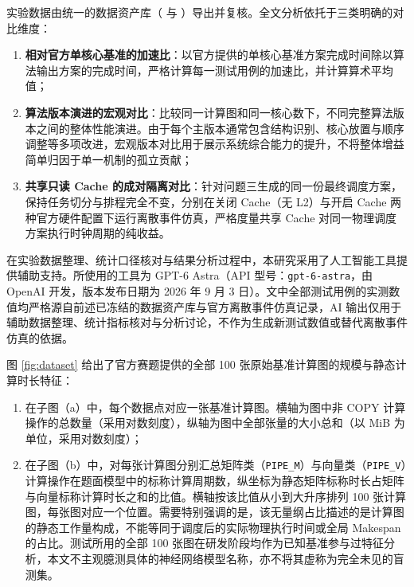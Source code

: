 \documentclass[anonymous,withtoc]{gmcm2026}
\providecommand{\tightlist}{\setlength{\itemsep}{0pt}\setlength{\parskip}{0pt}}
\begin{document}
实验数据由统一的数据资产库（\texttt{} 与 \texttt{}）导出并复核。全文分析依托于三类明确的对比维度：

\begin{enumerate}
\def\labelenumi{\arabic{enumi}.}
\tightlist
\item
  \textbf{相对官方单核心基准的加速比}：以官方提供的单核心基准方案完成时间除以算法输出方案的完成时间，严格计算每一测试用例的加速比，并计算算术平均值；
\item
  \textbf{算法版本演进的宏观对比}：比较同一计算图和同一核心数下，不同完整算法版本之间的整体性能演进。由于每个主版本通常包含结构识别、核心放置与顺序调整等多项改进，宏观版本对比用于展示系统综合能力的提升，不将整体增益简单归因于单一机制的孤立贡献；
\item
  \textbf{共享只读 Cache 的成对隔离对比}：针对问题三生成的同一份最终调度方案，保持任务切分与排程完全不变，分别在关闭 Cache（无 L2）与开启 Cache 两种官方硬件配置下运行离散事件仿真，严格度量共享 Cache 对同一物理调度方案执行时钟周期的纯收益。
\end{enumerate}

在实验数据整理、统计口径核对与结果分析过程中，本研究采用了人工智能工具提供辅助支持。所使用的工具为 GPT-6 Astra（API 型号：\texttt{gpt-6-astra}，由 OpenAI 开发，版本发布日期为 2026 年 9 月 3 日）\cite{openai-gpt6-astra}。文中全部测试用例的实测数值均严格源自前述已冻结的数据资产库与官方离散事件仿真记录，AI 输出仅用于辅助数据整理、统计指标核对与分析讨论，不作为生成新测试数值或替代离散事件仿真的依据。

图 \ref{fig:dataset} 给出了官方赛题提供的全部 100 张原始基准计算图的规模与静态计算时长特征：

\begin{enumerate}
\def\labelenumi{\arabic{enumi}.}
\tightlist
\item
  在子图（a）中，每个数据点对应一张基准计算图。横轴为图中非 COPY 计算操作的总数量（采用对数刻度），纵轴为图中全部张量的大小总和（以 MiB 为单位，采用对数刻度）；
\item
  在子图（b）中，对每张计算图分别汇总矩阵类（\texttt{PIPE\_M}）与向量类（\texttt{PIPE\_V}）计算操作在题面模型中的标称计算周期数，纵坐标为静态矩阵标称时长占矩阵与向量标称计算时长之和的比值。横轴按该比值从小到大升序排列 100 张计算图，每张图对应一个位置。需要特别强调的是，该无量纲占比描述的是计算图的静态工作量构成，不能等同于调度后的实际物理执行时间或全局 Makespan 的占比。测试所用的全部 100 张图在研发阶段均作为已知基准参与过特征分析，本文不主观臆测具体的神经网络模型名称，亦不将其虚称为完全未见的盲测集。
\end{enumerate}
\end{document}
